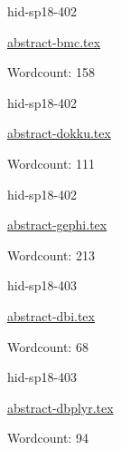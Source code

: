 

\begin{IU}

hid-sp18-402

\href{https://github.com/cloudmesh-community/hid-sp18-402/blob/master//technology/abstract-bmc.tex}{abstract-bmc.tex}

 

Wordcount: 158

\end{IU}



\begin{IU}

hid-sp18-402

\href{https://github.com/cloudmesh-community/hid-sp18-402/blob/master//technology/abstract-dokku.tex}{abstract-dokku.tex}

 

Wordcount: 111

\end{IU}



\begin{IU}

hid-sp18-402

\href{https://github.com/cloudmesh-community/hid-sp18-402/blob/master//technology/abstract-gephi.tex}{abstract-gephi.tex}

 

Wordcount: 213

\end{IU}



\begin{IU}

hid-sp18-403

\href{https://github.com/cloudmesh-community/hid-sp18-403/blob/master//technology/abstract-dbi.tex}{abstract-dbi.tex}

 

Wordcount: 68

\end{IU}



\begin{IU}

hid-sp18-403

\href{https://github.com/cloudmesh-community/hid-sp18-403/blob/master//technology/abstract-dbplyr.tex}{abstract-dbplyr.tex}

 

Wordcount: 94

\end{IU}

